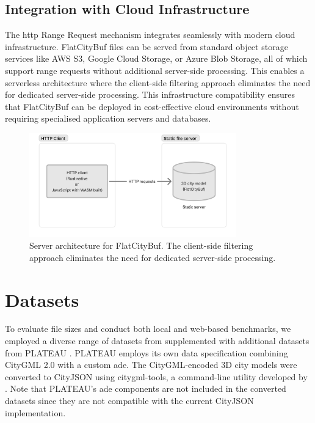 \subsection{Integration with Cloud Infrastructure}
\label{result:cross_platform_implementation:cloud_integration}

The \ac{http} Range Request mechanism integrates seamlessly with modern cloud infrastructure. FlatCityBuf files can be served from standard object storage services like AWS S3, Google Cloud Storage, or Azure Blob Storage, all of which support range requests without additional server-side processing. This enables a serverless architecture where the client-side filtering approach eliminates the need for dedicated server-side processing. This infrastructure compatibility ensures that FlatCityBuf can be deployed in cost-effective cloud environments without requiring specialised application servers and databases.

\begin{figure}[ht]
  \centering
  \includegraphics[width=0.8\textwidth]{figs/result_analysis/server_architecture_fcb.png}
  \caption{Server architecture for FlatCityBuf. The client-side filtering approach eliminates the need for dedicated server-side processing.}
  \label{fig:result:cross_platform_implementation:server_architecture}
\end{figure}
\section{Datasets}
\label{result:dataset}

To evaluate file sizes and conduct both local and web-based benchmarks, we employed a diverse range of datasets from \citet{ledoux_2024} supplemented with additional datasets from PLATEAU \citep{plateau}. PLATEAU employs its own data specification combining CityGML 2.0 \citep{CityGML} with a custom \ac{ade}. The CityGML-encoded 3D city models were converted to CityJSON using citygml-tools, a command-line utility developed by \citet{citygml_tools}. Note that PLATEAU's \ac{ade} components are not included in the converted datasets since they are not compatible with the current CityJSON implementation.

